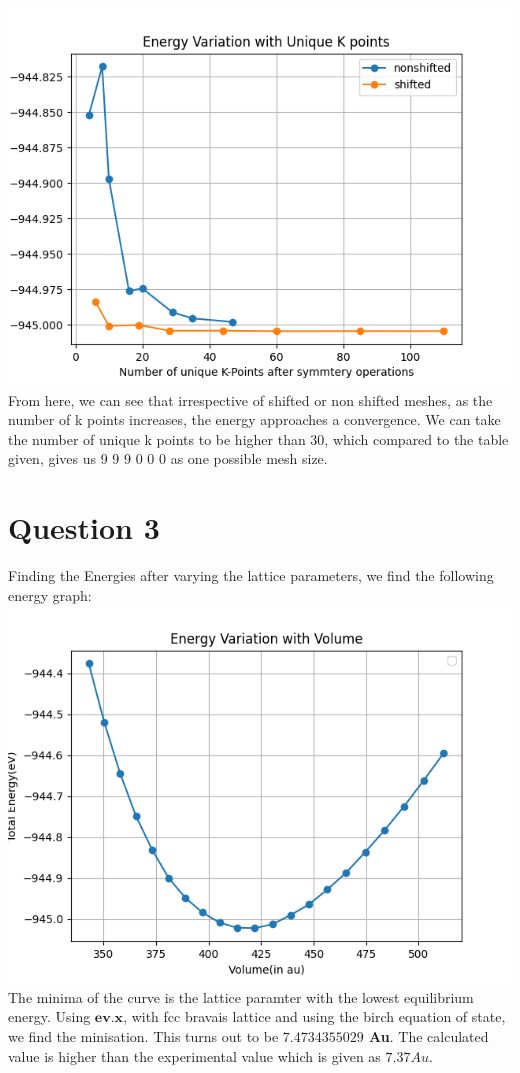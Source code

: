 \documentclass[11pt]{article}
\begin{document}
\includegraphics[scale=0.75]{Q2.png}\\
From here, we can see that irrespective of shifted or non shifted meshes, as the number of k points increases, the energy approaches a convergence. We can take the number of unique k points to be higher than 30, which compared to the table given, gives us 9 9 9 0 0 0 as one possible mesh size.

\section{Question 3}
Finding the Energies after varying the lattice parameters, we find the following energy graph:\\
\includegraphics[scale=0.75]{Q3b.png}\\
The minima of the curve is the lattice paramter with the lowest equilibrium energy. Using $\textbf{ev.x}$, with fcc bravais lattice and using the birch equation of state, we find the minisation. This turns out to be \textbf{$7.4734355029$ Au}. The calculated value is higher than the experimental value which is given as $7.37 Au$.
\end{document}

